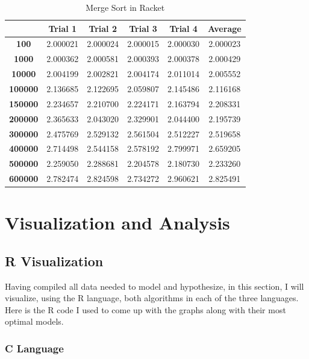 \documentclass[]{report}
\begin{document}
		 		\begin{table}[H]  
  				  \centering
  				  \caption{Merge Sort in Racket}
		 		  \begin{tabular}{cccccc}
		 		    \toprule
		 		         & \textbf{Trial 1} & \textbf{Trial 2} & \textbf{Trial 3} & \textbf{Trial 4} & \textbf{Average} \\ \midrule
		 		    \textbf{100} 	& 2.000021 & 2.000024 & 2.000015 & 2.000030 & 2.000023   \\
		 		    \textbf{1000} 	& 2.000362 & 2.000581 & 2.000393 & 2.000378 & 2.000429   \\
		 		    \textbf{10000}	& 2.004199 & 2.002821 & 2.004174 & 2.011014 & 2.005552   \\
		 		    \textbf{100000} & 2.136685 & 2.122695 & 2.059807 & 2.145486 & 2.116168   \\
		 		    \textbf{150000} & 2.234657 & 2.210700 & 2.224171 & 2.163794 & 2.208331   \\
		 		    \textbf{200000} & 2.365633 & 2.043020 & 2.329901 & 2.044400 & 2.195739   \\
		 		    \textbf{300000} & 2.475769 & 2.529132 & 2.561504 & 2.512227 & 2.519658   \\
		 		    \textbf{400000} & 2.714498 & 2.544158 & 2.578192 & 2.799971 & 2.659205   \\
		 		    \textbf{500000} & 2.259050 & 2.288681 & 2.204578 & 2.180730 & 2.233260   \\
		 		    \textbf{600000} & 2.782474 & 2.824598 & 2.734272 & 2.960621 & 2.825491   \\ \bottomrule
		 		  \end{tabular}
		 		\end{table}
		 			
	    
	    
	    \chapter{Visualization and Analysis}
	    \section{R Visualization}
	    Having compiled all data needed to model and hypothesize, in this section, I will visualize, using the R language, both algorithms in each of the three languages. Here is the R code I used to come up with the graphs along with their most optimal models.
	    	
			\subsection{C Language}
			
\end{document}
